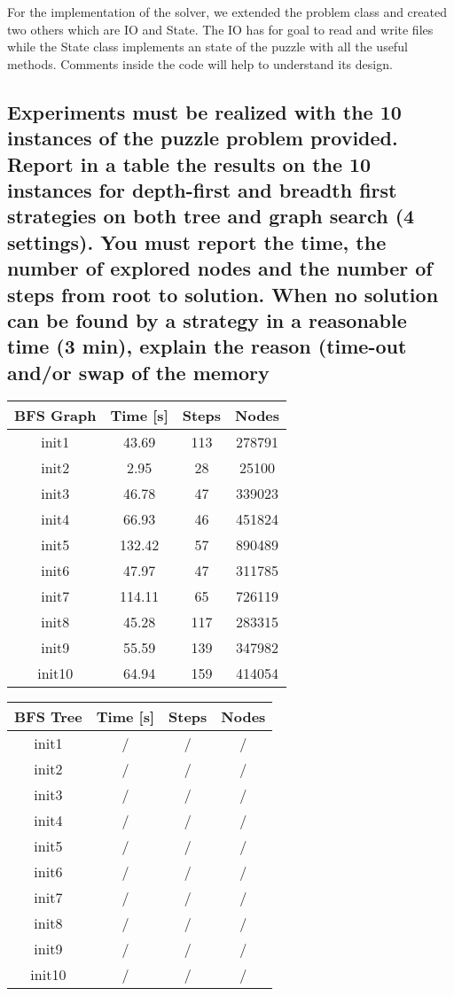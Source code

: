 \documentclass[a4paper,10pt]{article}
\begin{document}
	For the implementation of the solver, we extended the problem class and created two others which are IO and State. The IO has for goal to read and write files while the State class implements an state of the puzzle with all the useful methods. Comments inside the code will help to understand its design.
	
	\subsection{Experiments must be realized with the 10 instances of the puzzle problem provided. Report in a table the results on the 10 instances for depth-first and breadth first strategies on both tree and graph search (4 settings). You must report the time, the number of explored nodes and the number of steps from root to solution. When no solution can be found by a strategy in a reasonable time (3 min), explain the reason (time-out and/or swap of the memory}
	
	\begin{tabular}{|c||c|c|c|}
		\hline 
		\textbf{BFS Graph} & \textbf{Time [s]} & \textbf{Steps} & \textbf{Nodes} \\ 
		\hline 
		init1 & 43.69 & 113 & 278791 \\ 
		\hline 
		init2 & 2.95 & 28 & 25100 \\ 
		\hline 
		init3 & 46.78 & 47 & 339023 \\ 
		\hline 
		init4 & 66.93 & 46 & 451824 \\ 
		\hline 
		init5 & 132.42 & 57 & 890489 \\ 
		\hline 
		init6 & 47.97 & 47 & 311785 \\ 
		\hline 
		init7 & 114.11 & 65 & 726119 \\ 
		\hline 
		init8 & 45.28 & 117 & 283315 \\ 
		\hline 
		init9 & 55.59 & 139 & 347982 \\ 
		\hline 
		init10 & 64.94 & 159 & 414054 \\ 
		\hline 
	\end{tabular}
	\hspace{0.5cm}
	\begin{tabular}{|c||c|c|c|}
		\hline 
		\textbf{BFS Tree} & \textbf{Time [s]} & \textbf{Steps} & \textbf{Nodes} \\ 
		\hline 
		init1 & / & / & / \\ 
		\hline 
		init2 & / & / & / \\ 
		\hline 
		init3 & / & / & / \\ 
		\hline 
		init4 & / & / & / \\ 
		\hline 
		init5 & / & / & / \\ 
		\hline 
		init6 & / & / & / \\ 
		\hline 
		init7 & / & / & / \\ 
		\hline 
		init8 & / & / & / \\ 
		\hline 
		init9 & / & / & / \\ 
		\hline 
		init10 & / & / & / \\ 
		\hline 
	\end{tabular}\\
	\vspace{1cm}
	
\end{document}
